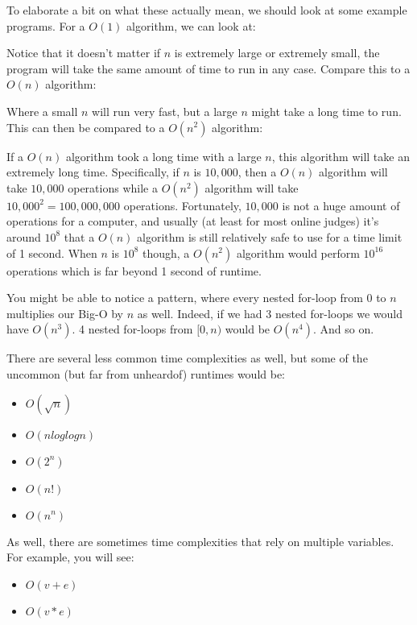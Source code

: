 To elaborate a bit on what these actually mean, we should look at some example programs. For a $O(1)$ algorithm, we can look at:


Notice that it doesn't matter if $n$ is extremely large or extremely small, the program will take the same amount of time to run in any case. Compare this to a $O(n)$ algorithm:


Where a small $n$ will run very fast, but a large $n$ might take a long time to run. This can then be compared to a $O(n^2)$ algorithm:


If a $O(n)$ algorithm took a long time with a large $n$, this algorithm will take an extremely long time. Specifically, if $n$ is $10,000$, then a $O(n)$ algorithm will take $10,000$ operations while a $O(n^2)$ algorithm will take $10,000^2 = 100,000,000$ operations. Fortunately, $10,000$ is not a huge amount of operations for a computer, and usually (at least for most online judges) it's around $10^8$ that a $O(n)$ algorithm is still relatively safe to use for a time limit of 1 second. When $n$ is $10^8$ though, a $O(n^2)$ algorithm would perform $10^{16}$ operations which is far beyond 1 second of runtime.

You might be able to notice a pattern, where every nested for-loop from $0$ to $n$ multiplies our Big-O by $n$ as well. Indeed, if we had 3 nested for-loops we would have $O(n^3)$. 4 nested for-loops from $[0,n)$ would be $O(n^4)$. And so on.

There are several less common time complexities as well, but some of the uncommon (but far from unheardof) runtimes would be:

\begin{itemize}
\item $O(\sqrt{n})$
\item $O(n log log n)$
\item $O(2^n)$
\item $O(n!)$
\item $O(n^n)$
\end{itemize}

As well, there are sometimes time complexities that rely on multiple variables. For example, you will see:

\begin{itemize}
\item $O(v + e)$
\item $O(v * e)$
\end{itemize}

